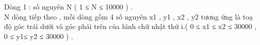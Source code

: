 Dòng 1 : số nguyên N ( 1 ≤ N ≤ 10000 ) .
\\N dòng tiếp theo , mỗi dòng gồm 4 số nguyên x1 , y1 , x2 , y2 tương ứng là toạ độ góc trái dưới và góc phải trên của hình chữ nhật thứ i.( 0 ≤ x1 ≤ x2 ≤ 30000 , 0 ≤ y1≤ y2 ≤ 30000 ) .